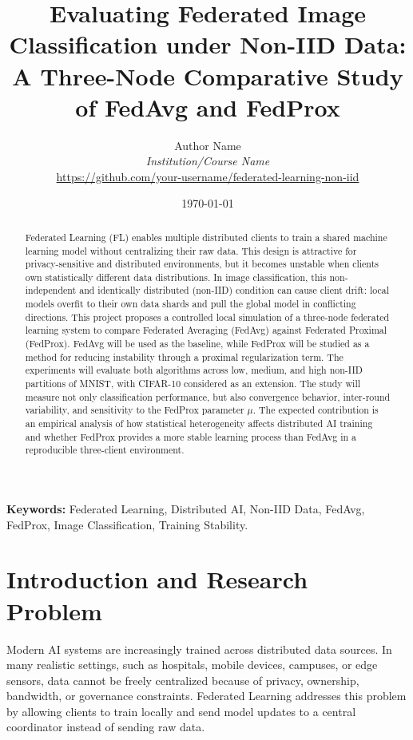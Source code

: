 \documentclass[11pt,a4paper]{article}
\title{\textbf{Evaluating Federated Image Classification under Non-IID Data:}\\
\large A Three-Node Comparative Study of FedAvg and FedProx}
\author{Author Name \\ \textit{Institution/Course Name} \\
\url{https://github.com/your-username/federated-learning-non-iid}}
\date{\today}
\begin{document}
\maketitle

\begin{abstract}
Federated Learning (FL) enables multiple distributed clients to train a shared machine learning model without centralizing their raw data. This design is attractive for privacy-sensitive and distributed environments, but it becomes unstable when clients own statistically different data distributions. In image classification, this non-independent and identically distributed (non-IID) condition can cause client drift: local models overfit to their own data shards and pull the global model in conflicting directions. This project proposes a controlled local simulation of a three-node federated learning system to compare Federated Averaging (FedAvg) against Federated Proximal (FedProx). FedAvg will be used as the baseline, while FedProx will be studied as a method for reducing instability through a proximal regularization term. The experiments will evaluate both algorithms across low, medium, and high non-IID partitions of MNIST, with CIFAR-10 considered as an extension. The study will measure not only classification performance, but also convergence behavior, inter-round variability, and sensitivity to the FedProx parameter $\mu$. The expected contribution is an empirical analysis of how statistical heterogeneity affects distributed AI training and whether FedProx provides a more stable learning process than FedAvg in a reproducible three-client environment.
\end{abstract}

\noindent\textbf{Keywords:} Federated Learning, Distributed AI, Non-IID Data, FedAvg, FedProx, Image Classification, Training Stability.

\section{Introduction and Research Problem}

Modern AI systems are increasingly trained across distributed data sources. In many realistic settings, such as hospitals, mobile devices, campuses, or edge sensors, data cannot be freely centralized because of privacy, ownership, bandwidth, or governance constraints. Federated Learning addresses this problem by allowing clients to train locally and send model updates to a central coordinator instead of sending raw data.
\end{document}
